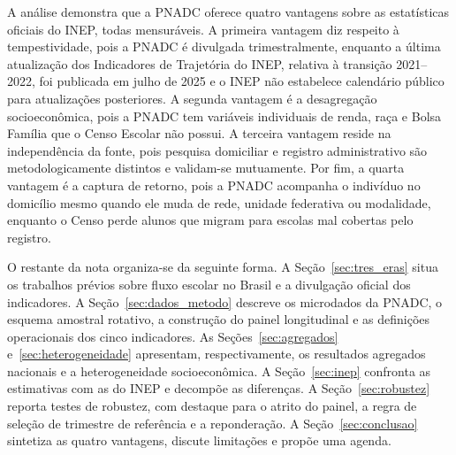 A análise demonstra que a PNADC oferece quatro vantagens sobre as
estatísticas oficiais do INEP, todas mensuráveis. A primeira vantagem
diz respeito à tempestividade, pois a PNADC é divulgada trimestralmente,
enquanto a última atualização dos Indicadores de Trajetória do INEP,
relativa à transição 2021--2022, foi publicada em julho de 2025 e o
INEP não estabelece calendário público para atualizações posteriores.
A segunda vantagem é a desagregação socioeconômica, pois a PNADC tem
variáveis individuais de renda, raça e Bolsa Família que o Censo
Escolar não possui. A terceira vantagem reside na independência da
fonte, pois pesquisa domiciliar e registro administrativo são
metodologicamente distintos e validam-se mutuamente. Por fim, a
quarta vantagem é a captura de retorno, pois a PNADC acompanha o
indivíduo no domicílio mesmo quando ele muda de rede, unidade
federativa ou modalidade, enquanto o Censo perde alunos que migram
para escolas mal cobertas pelo registro.

O restante da nota organiza-se da seguinte forma. A
Seção~\ref{sec:tres_eras} situa os trabalhos prévios sobre fluxo
escolar no Brasil e a divulgação oficial dos indicadores. A Seção~\ref{sec:dados_metodo} descreve os microdados
da PNADC, o esquema amostral rotativo, a construção do painel
longitudinal e as definições operacionais dos cinco indicadores. As
Seções~\ref{sec:agregados} e~\ref{sec:heterogeneidade} apresentam,
respectivamente, os resultados agregados nacionais e a heterogeneidade
socioeconômica. A Seção~\ref{sec:inep} confronta as estimativas com as
do INEP e decompõe as diferenças. A Seção~\ref{sec:robustez} reporta
testes de robustez, com destaque para o atrito do painel, a regra de
seleção de trimestre de referência e a reponderação. A
Seção~\ref{sec:conclusao} sintetiza as quatro vantagens, discute
limitações e propõe uma agenda.
